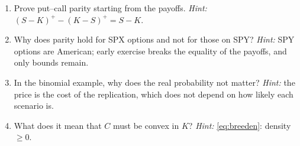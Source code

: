 \begin{domande}[unbreakable]
\begin{enumerate}
\item Prove put--call parity starting from the payoffs. \emph{Hint:} $(S-K)^+-(K-S)^+=S-K$.
\item Why does parity hold for SPX options and not for those on SPY? \emph{Hint:} SPY options are American; early
exercise breaks the equality of the payoffs, and only bounds remain.
\item In the binomial example, why does the real probability not matter? \emph{Hint:} the price is the cost of the
replication, which does not depend on how likely each scenario is.
\item What does it mean that $C$ must be convex in $K$? \emph{Hint:} \eqref{eq:breeden}: density $\ge0$.
\end{enumerate}
\end{domande}
